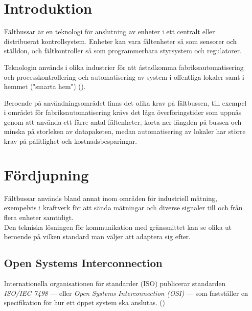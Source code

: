 \documentclass[a4paper,12pt]{article}
\title{\articlename}
\author{\authorname}
\begin{document}
\maketitle
{}
\thispagestyle{empty}
\clearpage


\begin{multicols}{2}

\section{Introduktion}

Fältbussar är en teknologi för anslutning av enheter i ett centralt eller distribuerat kontrollsystem. Enheter kan vara fältenheter så som sensorer och ställdon, och fältkontroller så som programmerbara styrsystem och regulatorer.

Teknologin används i olika industrier för att åstadkomma fabriksautomatisering och processkontrollering och automatisering av system i offentliga lokaler samt i hemmet ("smarta hem") (\cite[s. 22-25]{distributedfieldbuscontrolnetworksystems}).

Beroende på användningsområdet finns det olika krav på fältbussen, till exempel i området för fabriksautomatisering krävs det låga överföringstider som uppnås genom att använda ett färre antal fältenheter, korta ner längden på bussen och minska på storleken av datapaketen, medan automatisering av lokaler har större krav på pålitlighet och kostnadsbesparingar.

\section{Fördjupning}

Fältbussar används bland annat inom områden för industriell mätning, exempelvis i kraftverk för att sända mätningar och diverse signaler till och från flera enheter samtidigt.\\
Den tekniska lösningen för kommunikation med gränssnittet kan se olika ut beroende på vilken standard man väljer att adaptera sig efter.

\subsection{Open Systems Interconnection}

Internationella organisationen för standarder (ISO) publicerar standarden \textit{ISO/IEC 7498} --- eller \textit{Open Systems Interconnection (OSI)} --- som fastställer en specifikation för hur ett öppet system ska anslutas. (\cite{iso74981})


\end{multicols}
\end{document}

